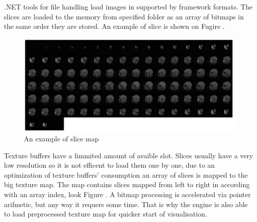\documentclass[twoside, english, 11pt]{report}
\begin{document}
.NET tools for file handling load images in supported by framework formats. The slices are loaded to the memory from specified folder as an array of bitmaps in the same order they are stored. An example of slice is shown on Fugire \label{fig:slice}.\\

\begin{figure}[!h]
\centerline{\includegraphics[scale = 0.35]{img/map}}
\caption{An example of slice map\label{fig:map}}
\end{figure}
Texture buffers have a limmited amount of avaible slot. Slices usually have a very low resolution so it is not efficent to load them one by one, due to an optimization of texture buffers' consumption an array of slices is mapped to the big texture map. The map contains slices mapped from left to right in according with an array index, look Figure \label{fig:map}. A bitmap processing is accelerated via pointer arifmetic, but any way it requers some time. That is why the engine is also able to load preprocessed texture map for quicker start of visualisation. \\
\end{document}

